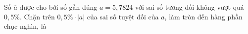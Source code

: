 \begin{ex}
Số $\overline a$ được cho bởi số gần đúng $a=5{,}7824$ với sai số tương đối không vượt quá $0{,}5\%$. Chặn trên $0{,}5\%\cdot|a|$ của sai số tuyệt đối của $a$, làm tròn đến hàng phần chục nghìn, là
\end{ex}
